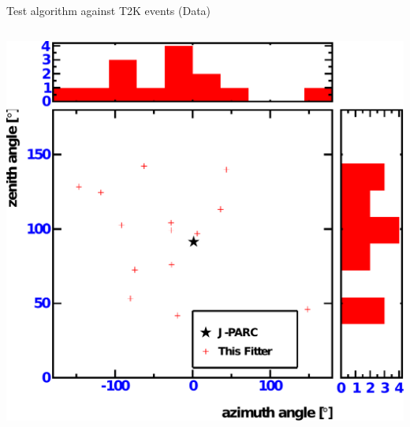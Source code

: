 \documentclass[14pt]{beamer}
\begin{document}
\begin{frame}{Test algorithm against T2K events (Data)}
\begin{columns}[T]
\begin{block}{}
			\includegraphics[width=\linewidth]{analyzed_rtq_t2k_nu_noNegativeCharge_prepulseCut_t2kReconDir.pdf}
		\end{block}
	\end{columns}
\end{frame}
\end{document}
